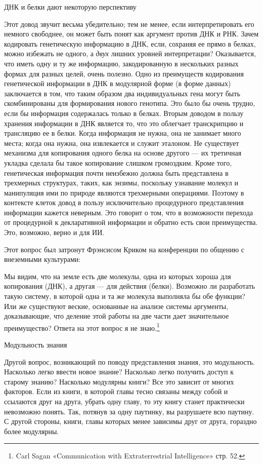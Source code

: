 ДНК и белки дают некоторую перспективу

Этот довод звучит весьма убедительно; тем не менее, если интерпретировать его немного свободнее, он может быть понят как аргумент против ДНК и РНК. Зачем кодировать генетическую информацию в ДНК, если, сохраняя ее прямо в белках, можно избежать не одного, а \emph{двух} лишних уровней интерпретации? Оказывается, что иметь одну и ту же информацию, закодированную в нескольких разных формах для разных целей, очень полезно. Одно из преимуществ кодирования генетической информации в ДНК в модулярной форме (в форме данных) заключается в том, что таким образом два индивидуальных гена могут быть скомбинированы для формирования нового генотипа. Это было бы очень трудно, если бы информация содержалась только в белках. Вторым доводом в пользу хранения информации в ДНК является то, что это облегчает транскрипцию и трансляцию ее в белки. Когда информация не нужна, она не занимает много места; когда она нужна, она извлекается и служит эталоном. Не существует механизма для копирования одного белка на основе другого --- их третичная укладка сделала бы такое копирование слишком громоздким. Кроме того, генетическая информация почти неизбежно должна быть представлена в трехмерных структурах, таких, как энзимы, поскольку узнавание молекул и манипуляция ими по природе являются трехмерными операциями. Поэтому в контексте клеток довод в пользу исключительно процедурного представления информации кажется неверным. Это говорит о том, что в возможности перехода от процедурной к декларативной информации и обратно есть свои преимущества. Это, возможно, верно и для ИИ.

Этот вопрос был затронут Фрэнсисом Криком на конференции по общению с внеземными культурами:

Мы видим, что на земле есть две молекулы, одна из которых хороша для копирования (ДНК), а другая --- для действия (белки). Возможно ли разработать такую систему, в которой одна и та же молекула выполняла бы обе функции? Или же существуют веские, основанные на анализе системы аргументы, доказывающие, что деление этой работы на две части дает значительное преимущество? Ответа на этот вопрос я не знаю.\footnote{Carl Sagan «Communication with Extraterrestrial Intelligence» стр. 52.}

Модульность знания

Другой вопрос, возникающий по поводу представления знания, это модульность. Насколько легко ввести новое знание? Насколько легко получить доступ к старому знанию? Насколько модулярны книги? Все это зависит от многих факторов. Если из книги, в которой главы тесно связаны между собой и ссылаются друг на друга, убрать одну главу, то эту книгу станет практически невозможно понять. Так, потянув за одну паутинку, вы разрушаете всю паутину. С другой стороны, книги, главы которых менее зависимы друг от друга, гораздно более модулярны.

